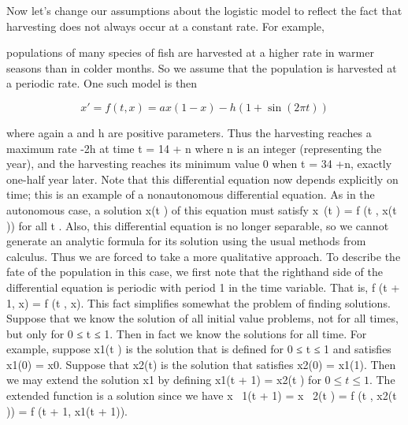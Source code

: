 \documentclass{article}
\begin{document}
Now let’s change our assumptions about the logistic model to reflect the
fact that harvesting does not always occur at a constant rate. For example,

populations of many species of fish are harvested at a higher rate in warmer
seasons than in colder months. So we assume that the population is harvested
at a periodic rate. One such model is then

\[
x'  = f (t , x) = ax(1 - x) - h(1 + \sin(2 \pi t ))
\]


where again a and h are positive parameters. Thus the harvesting reaches a
maximum rate -2h at time t = 14
+ n where n is an integer (representing the
year), and the harvesting reaches its minimum value 0 when t = 34
+n, exactly
one-half year later. Note that this differential equation now depends explicitly
on time; this is an example of a nonautonomous differential equation. As in
the autonomous case, a solution x(t ) of this equation must satisfy x (t ) =
f (t , x(t )) for all t . Also, this differential equation is no longer separable, so we
cannot generate an analytic formula for its solution using the usual methods
from calculus. Thus we are forced to take a more qualitative approach.
To describe the fate of the population in this case, we first note that the righthand
side of the differential equation is periodic with period 1 in the time
variable. That is, f (t + 1, x) = f (t , x). This fact simplifies somewhat the
problem of finding solutions. Suppose that we know the solution of all initial
value problems, not for all times, but only for 0 ≤ t ≤ 1. Then in fact we
know the solutions for all time. For example, suppose x1(t ) is the solution that
is defined for 0 ≤ t ≤ 1 and satisfies x1(0) = x0. Suppose that x2(t) is the
solution that satisfies x2(0) = x1(1). Then we may extend the solution x1 by
defining x1(t + 1) = x2(t ) for $0 \leq t \leq 1$. The extended function is a solution
since we have
x 
1(t + 1) = x 
2(t ) = f (t , x2(t ))
= f (t + 1, x1(t + 1)).
\end{document}
